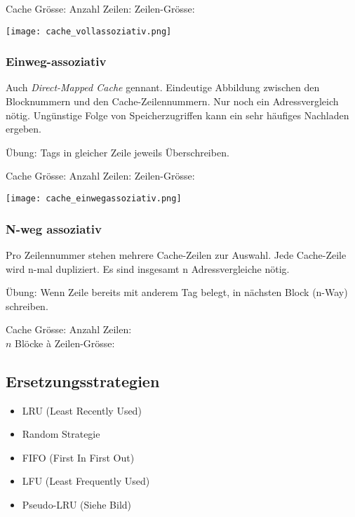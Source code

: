 Cache Grösse: 
Anzahl Zeilen: 
Zeilen-Grösse: 

\begin{center}
    \texttt{[image: cache\_vollassoziativ.png]}
\end{center}

\subsubsection{Einweg-assoziativ}

Auch \textit{Direct-Mapped Cache} gennant. Eindeutige Abbildung zwischen den Blocknummern und den Cache-Zeilennummern.
Nur noch ein Adressvergleich nötig. Ungünstige Folge von Speicherzugriffen kann ein sehr häufiges Nachladen ergeben.

Übung: Tags in gleicher Zeile jeweils Überschreiben.

Cache Grösse: 
Anzahl Zeilen: 
Zeilen-Grösse: 

\begin{center}
    \texttt{[image: cache\_einwegassoziativ.png]}
\end{center}

\subsubsection{N-weg assoziativ}

Pro Zeilennummer stehen mehrere Cache-Zeilen zur Auswahl. Jede Cache-Zeile wird n-mal dupliziert.
Es sind insgesamt n Adressvergleiche nötig.

Übung: Wenn Zeile bereits mit anderem Tag belegt, in nächsten Block (n-Way) schreiben.

Cache Grösse: 
Anzahl Zeilen: \\
$n$ Blöcke à Zeilen-Grösse: 

\subsection{Ersetzungsstrategien}

\begin{itemize}
    \itemsep-.5em 
    \item LRU (Least Recently Used)
    \item Random Strategie
    \item FIFO (First In First Out)
    \item LFU (Least Frequently Used)
    \item Pseudo-LRU (Siehe Bild)
\end{itemize}

